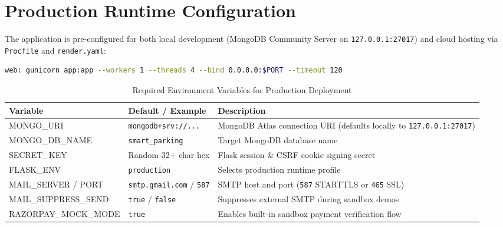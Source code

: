 \documentclass[12pt,a4paper,oneside]{report}
\begin{document}
\section{Production Runtime Configuration}
The application is pre-configured for both local development (MongoDB Community Server on \texttt{127.0.0.1:27017}) and cloud hosting via \texttt{Procfile} and \texttt{render.yaml}:

\begin{lstlisting}[language=bash,caption={Procfile and Render Start Command for 512 MB Cloud Tier},label={lst:procfile}]
web: gunicorn app:app --workers 1 --threads 4 --bind 0.0.0.0:$PORT --timeout 120
\end{lstlisting}

\begin{table}[H]
\centering
\caption{Required Environment Variables for Production Deployment}
\label{tab:env_vars}
\begin{tabularx}{\textwidth}{>{\ttfamily}p{4.5cm} p{3.2cm} X}
\toprule
\textbf{Variable} & \textbf{Default / Example} & \textbf{Description} \\
\midrule
MONGO\_URI & \texttt{mongodb+srv://...} & MongoDB Atlas connection URI (defaults locally to \texttt{127.0.0.1:27017}) \\
MONGO\_DB\_NAME & \texttt{smart\_parking} & Target MongoDB database name \\
SECRET\_KEY & Random 32+ char hex & Flask session \& CSRF cookie signing secret \\
FLASK\_ENV & \texttt{production} & Selects production runtime profile \\
MAIL\_SERVER / PORT & \texttt{smtp.gmail.com} / \texttt{587} & SMTP host and port (\texttt{587} STARTTLS or \texttt{465} SSL) \\
MAIL\_SUPPRESS\_SEND & \texttt{true} / \texttt{false} & Suppresses external SMTP during sandbox demos \\
RAZORPAY\_MOCK\_MODE & \texttt{true} & Enables built-in sandbox payment verification flow \\
\bottomrule
\end{tabularx}
\end{table}
\end{document}
